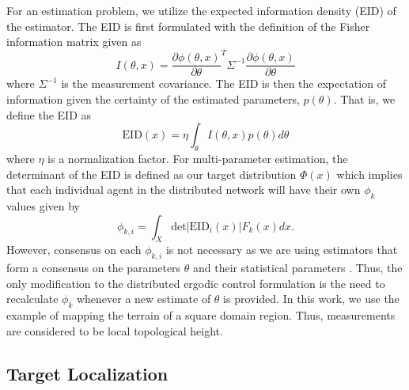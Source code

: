 \documentclass[conference]{IEEEtran}
\begin{document}
For an estimation problem, we utilize the expected information density (EID) of the estimator. The EID is first formulated with the definition of the Fisher information matrix given as
\begin{equation}
I(\theta, x) = \frac{\partial \phi(\theta, x)}{ \partial \theta} ^T \Sigma^{-1} \frac{\partial \phi(\theta, x)}{ \partial \theta}
\end{equation}
where $\Sigma^{-1}$ is the measurement covariance. The EID is then the expectation of information given the certainty of the estimated parameters, $p(\theta)$. That is, we define the EID as
\begin{equation}
\text{EID}(x) = \eta \int_\theta I(\theta, x) p(\theta) d\theta
\end{equation}
where $\eta$ is a normalization factor. For multi-parameter estimation, the determinant of the EID is defined as our target distribution $\Phi(x)$ which implies that each individual agent in the distributed network will have their own $\phi_k$ values given by
\begin{equation}
\phi_{k,i} = \int_X \text{det}\vert \text{EID}_i(x)\vert F_k(x) dx.
\end{equation}
However, consensus on each $\phi_{k,i}$ is not necessary as we are using estimators that form a consensus on the parameters $\theta$ and their statistical parameters \cite{carli2008distributed}. Thus, the only modification to the distributed ergodic control formulation is the need to recalculate $\phi_k$ whenever a new estimate of $\theta$ is provided. In this work, we use the example of mapping the terrain of a square domain region. Thus, measurements are considered to be local topological height.

\subsection{Target Localization}
\end{document}
